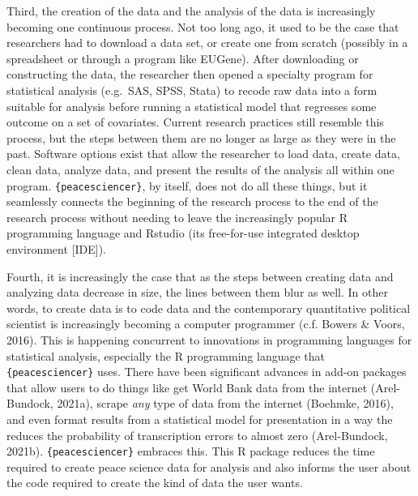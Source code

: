 \documentclass[
  11pt,
]{article}
\begin{document}
Third, the creation of the data and the analysis of the data is increasingly becoming one continuous process. Not too long ago, it used to be the case that researchers had to download a data set, or create one from scratch (possibly in a spreadsheet or through a program like EUGene). After downloading or constructing the data, the researcher then opened a specialty program for statistical analysis (e.g.~SAS, SPSS, Stata) to recode raw data into a form suitable for analysis before running a statistical model that regresses some outcome on a set of covariates. Current research practices still resemble this process, but the steps between them are no longer as large as they were in the past. Software options exist that allow the researcher to load data, create data, clean data, analyze data, and present the results of the analysis all within one program. \texttt{\{peacesciencer\}}, by itself, does not do all these things, but it seamlessly connects the beginning of the research process to the end of the research process without needing to leave the increasingly popular R programming language and Rstudio (its free-for-use integrated desktop environment {[}IDE{]}).

Fourth, it is increasingly the case that as the steps between creating data and analyzing data decrease in size, the lines between them blur as well. In other words, to create data is to code data and the contemporary quantitative political scientist is increasingly becoming a computer programmer (c.f. Bowers \& Voors, 2016). This is happening concurrent to innovations in programming languages for statistical analysis, especially the R programming language that \texttt{\{peacesciencer\}} uses. There have been significant advances in add-on packages that allow users to do things like get World Bank data from the internet (Arel-Bundock, 2021a), scrape \emph{any} type of data from the internet (Boehmke, 2016), and even format results from a statistical model for presentation in a way the reduces the probability of transcription errors to almost zero (Arel-Bundock, 2021b). \texttt{\{peacesciencer\}} embraces this. This R package reduces the time required to create peace science data for analysis and also informs the user about the code required to create the kind of data the user wants.
\end{document}
